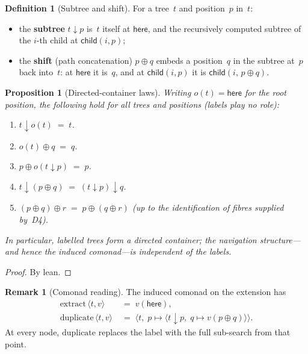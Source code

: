\documentclass[11pt,a4paper]{article}
\theoremstyle{plain}
\newtheorem{proposition}[theorem]{Proposition}
\theoremstyle{definition}
\newtheorem{definition}[theorem]{Definition}
\newtheorem{remark}[theorem]{Remark}
\begin{document}
\begin{definition}[Subtree and shift]\label{def:sub-shift}
For a tree~$t$ and position~$p$ in~$t$:
\begin{itemize}
  \item the \textbf{subtree} $t \mathbin{\downarrow} p$ is~$t$ itself at
        $\mathsf{here}$, and the recursively computed subtree of the
        $i$-th child at $\mathsf{child}(i, p)$;
  \item the \textbf{shift} (path concatenation)
        $p \oplus q$ embeds a position~$q$ in the subtree at~$p$ back
        into~$t$: at $\mathsf{here}$ it is~$q$, and at
        $\mathsf{child}(i, p)$ it is $\mathsf{child}(i,\, p \oplus q)$.
\end{itemize}
\end{definition}

\begin{proposition}[Directed-container laws]\label{prop:d-laws}
Writing $o(t) = \mathsf{here}$ for the root position, the following hold
for all trees and positions (labels play no role):
\begin{enumerate}
  \item[\textbf{D1.}] $t \mathbin{\downarrow} o(t) \;=\; t$.
  \item[\textbf{D2.}] $o(t) \oplus q \;=\; q$.
  \item[\textbf{D3.}] $p \oplus o(t \mathbin{\downarrow} p) \;=\; p$.
  \item[\textbf{D4.}]
        $t \mathbin{\downarrow} (p \oplus q)
         \;=\;
         (t \mathbin{\downarrow} p) \mathbin{\downarrow} q$.
  \item[\textbf{D5.}]
        $(p \oplus q) \oplus r \;=\; p \oplus (q \oplus r)$
        (up to the identification of fibres supplied by~D4).
\end{enumerate}
In particular, labelled trees form a directed container; the navigation
structure---and hence the induced comonad---is independent of the labels.
\end{proposition}

\begin{proof}
By lean.
\end{proof}

\begin{remark}[Comonad reading]
The induced comonad on the extension has
\begin{align}
  \mathrm{extract}\,\langle t, v \rangle
  &\;=\; v(\mathsf{here}), \\
  \mathrm{duplicate}\,\langle t, v \rangle
  &\;=\;
  \bigl\langle
    t,\;
    p \mapsto
    \bigl\langle
      t \mathbin{\downarrow} p,\;
      q \mapsto v(p \oplus q)
    \bigr\rangle
  \bigr\rangle.
\end{align}
At every node, $\mathrm{duplicate}$ replaces the label with the full
sub-search from that point.
\end{remark}
\end{document}
